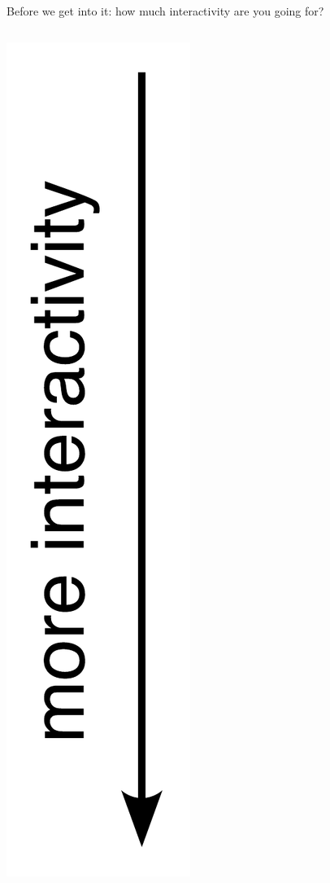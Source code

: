 \documentclass[aspectratio=169]{beamer}
\begin{document}
\begin{frame}{Before we get into it: how much interactivity are you going for?}
\Large
\vspace{0.5 cm}
\begin{columns}
\includegraphics[width=\linewidth]{img/more-interactivity.pdf}


\end{columns}
\end{frame}
\end{document}
